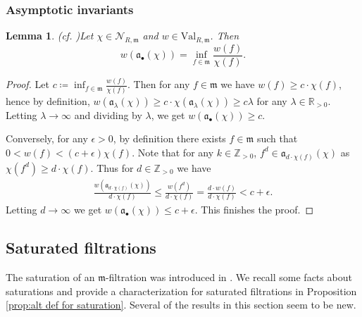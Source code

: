 \documentclass[11pt, leqno]{amsart}%
\theoremstyle{plain}
\newtheorem{lemma}[theorem]{Lemma}
\theoremstyle{definition}
\theoremstyle{remark}
\newcommand{\cN}{\mathcal{N}}
\newcommand{\bR}{\mathbb{R}}
\newcommand{\bZ}{\mathbb{Z}}
\newcommand{\fa}{\mathfrak{a}}
\newcommand{\fm}{\mathfrak{m}}
\newcommand{\vol}{\mathrm{vol}}
\newcommand{\Val}{\mathrm{Val}}
\newcommand{\QMVal}{\mathrm{QMVal}}
\numberwithin{equation}{section}
\begin{document}




\subsubsection{Asymptotic invariants}\label{sssec:asymp inv}



\begin{lemma}(cf. \cite[Lemma 2.4]{JM12})\label{lem:evaluation}
    Let $\chi\in\cN_{R,\fm}$ and $w\in\Val_{R,\fm}$. Then
    \[
        w(\fa_\bullet(\chi))=\inf_{f\in\fm}\frac{w(f)}{\chi(f)}.%
    \]
\end{lemma}

\begin{proof}
    Let $c\coloneqq\inf_{f\in\fm}\frac{w(f)}{\chi(f)}$. Then for any $f\in \fm$ we have $w(f)\ge c\cdot \chi(f)$, hence by definition, $w(\fa_\lambda(\chi))\ge c\cdot \chi(\fa_\lambda(\chi))\ge c\lambda$ for any $\lambda\in\bR_{>0}$. Letting $\lambda\to\infty$ and dividing by $\lambda$, we get $w(\fa_\bullet(\chi))\ge c$.
	
    Conversely, for any $\epsilon>0$, by definition there exists $f\in \fm$ such that $0<w(f)<(c+\epsilon)\chi(f)$. Note that for any $k\in\bZ_{>0}$, $f^d\in\fa_{d\cdot\chi(f)}(\chi)$ as $\chi(f^d)\ge d\cdot\chi(f)$.
    Thus for $d\in\bZ_{>0}$ we have 
    \begin{align*}
        \frac{w(\fa_{d\cdot\chi(f)}(\chi))}{d\cdot \chi(f)}\le\frac{w(f^d)}{d\cdot\chi(f)}=\frac{d\cdot w(f)}{d\cdot \chi(f)}<c+\epsilon.
    \end{align*}
    Letting $d\to\infty$ we get $w(\fa_\bullet(\chi))\le c+\epsilon$. This finishes the proof.
\end{proof}




\subsection{Saturated filtrations}\label{ssec:saturation}

The saturation of an $\fm$-filtration was introduced in \cite{BLQ22}. We recall some facts about saturations and provide a characterization for saturated filtrations in Proposition \ref{prop:alt def for saturation}. Several of the results in this section seem to be new.
\end{document}
